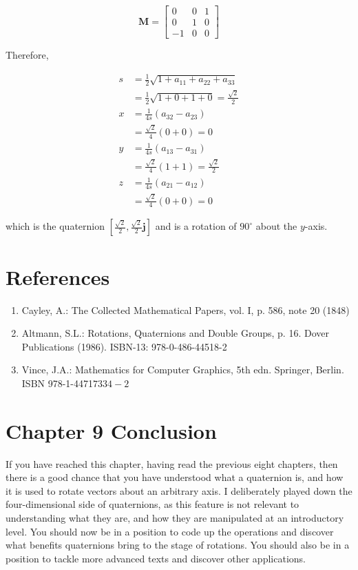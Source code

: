 \documentclass[10pt]{article}
\begin{document}
$$
\mathbf{M}=\left[\begin{array}{ccc}
0 & 0 & 1 \\
0 & 1 & 0 \\
-1 & 0 & 0
\end{array}\right]
$$

Therefore,

$$
\begin{aligned}
s & =\frac{1}{2} \sqrt{1+a_{11}+a_{22}+a_{33}} \\
& =\frac{1}{2} \sqrt{1+0+1+0}=\frac{\sqrt{2}}{2} \\
x & =\frac{1}{4 s}\left(a_{32}-a_{23}\right) \\
& =\frac{\sqrt{2}}{4}(0+0)=0 \\
y & =\frac{1}{4 s}\left(a_{13}-a_{31}\right) \\
& =\frac{\sqrt{2}}{4}(1+1)=\frac{\sqrt{2}}{2} \\
z & =\frac{1}{4 s}\left(a_{21}-a_{12}\right) \\
& =\frac{\sqrt{2}}{4}(0+0)=0
\end{aligned}
$$

which is the quaternion $\left[\frac{\sqrt{2}}{2}, \frac{\sqrt{2}}{2} \mathbf{j}\right]$ and is a rotation of $90^{\circ}$ about the $y$-axis.

\section{References}
\begin{enumerate}
  \item Cayley, A.: The Collected Mathematical Papers, vol. I, p. 586, note 20 (1848)

  \item Altmann, S.L.: Rotations, Quaternions and Double Groups, p. 16. Dover Publications (1986). ISBN-13: 978-0-486-44518-2

  \item Vince, J.A.: Mathematics for Computer Graphics, 5th edn. Springer, Berlin. ISBN 978-1-4471$7334-2$

\end{enumerate}

\section{Chapter 9
Conclusion}
If you have reached this chapter, having read the previous eight chapters, then there is a good chance that you have understood what a quaternion is, and how it is used to rotate vectors about an arbitrary axis. I deliberately played down the four-dimensional side of quaternions, as this feature is not relevant to understanding what they are, and how they are manipulated at an introductory level. You should now be in a position to code up the operations and discover what benefits quaternions bring to the stage of rotations. You should also be in a position to tackle more advanced texts and discover other applications.
\end{document}
